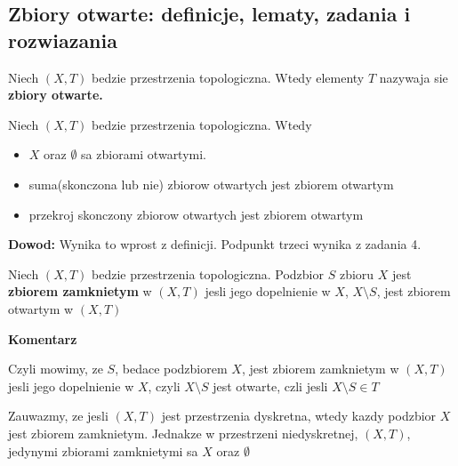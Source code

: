 \documentclass{article}
\begin{document}
\subsection{Zbiory otwarte: definicje, lematy, zadania i rozwiazania}
\begin{tcolorbox}[colback=white!90!red,colframe=black!35!red,title=1.2.1 Definicja: Zbior otwarty- open set]

Niech $(X, T)$ bedzie przestrzenia topologiczna. Wtedy elementy $T$ nazywaja sie \textbf{zbiory otwarte.}

\end{tcolorbox}

\begin{tcolorbox}[colback=white!90!green,colframe=black!35!green,title=1.2.2 Lemat: Przestrzen topologiczna i zbiory otwarte]
Niech $(X, T)$ bedzie przestrzenia topologiczna. Wtedy

\begin{itemize}%
       
\item $X$ oraz $\emptyset$ sa zbiorami otwartymi.
\item suma(skonczona lub nie) zbiorow otwartych jest zbiorem otwartym
\item przekroj skonczony zbiorow otwartych jest zbiorem otwartym
\end{itemize}%
\end{tcolorbox}
\textbf{Dowod:}
Wynika to wprost z definicji. Podpunkt trzeci wynika z zadania 4.

\begin{tcolorbox}[colback=white!90!red,colframe=black!35!red,title=1.2.3 Definicja: Zbior zamkniety- closed set]

Niech $(X,T)$ bedzie przestrzenia topologiczna. Podzbior $S$ zbioru $X$ jest \textbf{zbiorem zamknietym} w $(X, T)$ jesli jego dopelnienie w $X$, $X\setminus S$, jest zbiorem otwartym w $(X, T)$
\end{tcolorbox}
\textbf{Komentarz}

Czyli mowimy, ze $S$, bedace podzbiorem $X$, jest zbiorem zamknietym w $(X,T)$ jesli jego dopelnienie w $X$, czyli $X\setminus S$ jest otwarte, czli jesli $X\setminus S \in T$

Zauwazmy, ze jesli $(X,T)$ jest przestrzenia dyskretna, wtedy kazdy podzbior $X$ jest zbiorem zamknietym. Jednakze w przestrzeni niedyskretnej, $(X,T)$, jedynymi zbiorami zamknietymi sa $X$ oraz $\emptyset$
\end{document}
